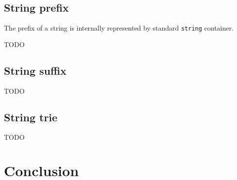 \documentclass[12pt,final,oneside]{fithesis2}
\theoremstyle{definition}
\begin{document}
\section{String prefix}

The prefix of a string is internally represented by standard \texttt{string}
container.

TODO


\section{String suffix}

TODO

\section{String trie}

TODO

\chapter{Conclusion}
\label{chap:conclusion}


\end{document}
